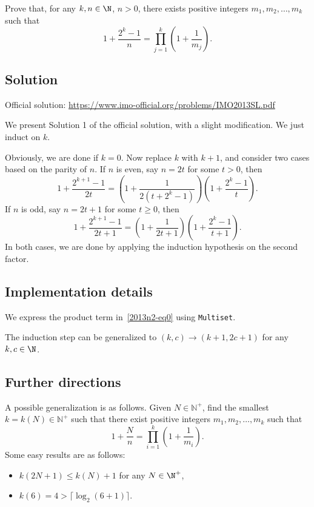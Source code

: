 Prove that, for any $k, n \in \N$, $n > 0$, there exists positive integers $m_1, m_2, \ldots, m_k$ such that
\[ 1 + \frac{2^k - 1}{n} = \prod_{j = 1}^k \left(1 + \frac{1}{m_j}\right). \tag{*}\label{2013n2-eq0} \]



\subsection*{Solution}

Official solution: \url{https://www.imo-official.org/problems/IMO2013SL.pdf}

We present Solution 1 of the official solution, with a slight modification.
We just induct on $k$.

Obviously, we are done if $k = 0$.
Now replace $k$ with $k + 1$, and consider two cases based on the parity of $n$.
If $n$ is even, say $n = 2t$ for some $t > 0$, then
\[ 1 + \frac{2^{k + 1} - 1}{2t} = \left(1 + \frac{1}{2(t + 2^k - 1)}\right) \left(1 + \frac{2^k - 1}{t}\right). \]
If $n$ is odd, say $n = 2t + 1$ for some $t \geq 0$, then
\[ 1 + \frac{2^{k + 1} - 1}{2t + 1} = \left(1 + \frac{1}{2t + 1}\right) \left(1 + \frac{2^k - 1}{t + 1}\right). \]
In both cases, we are done by applying the induction hypothesis on the second factor.



\subsection*{Implementation details}

We express the product term in~\eqref{2013n2-eq0} using \texttt{Multiset}.

The induction step can be generalized to $(k, c) \to (k + 1, 2c + 1)$ for any $k, c \in \N$.



\subsection*{Further directions}

A possible generalization is as follows.
Given $N \in ℕ^+$, find the smallest $k = k(N) \in ℕ^+$ such that
  there exist positive integers $m_1, m_2, \ldots, m_k$ such that
\[ 1 + \frac{N}{n} = \prod_{i = 1}^k \left(1 + \frac{1}{m_i}\right). \]
Some easy results are as follows:
\begin{itemize}
    \item   $k(2N + 1) \leq k(N) + 1$ for any $N \in \N^+$,
    \item   $k(6) = 4 > ⌈\log_2 (6 + 1)⌉$.
\end{itemize}
